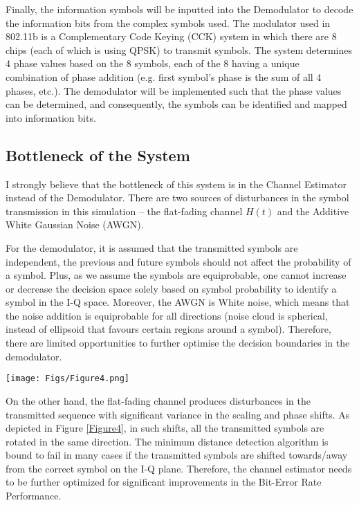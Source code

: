 \begin{flushleft}
Finally, the information symbols will be inputted into the Demodulator to decode the information bits
from the complex symbols used. The modulator used in 802.11b is a Complementary Code
Keying (CCK) system in which there are 8 chips (each of which is using QPSK) to transmit
symbols. The system determines 4 phase values based on the 8 symbols, each of the 8 having
a unique combination of phase addition (e.g. first symbol’s phase is the sum of all 4 phases,
etc.). The demodulator will be implemented such that the phase values can be determined,
and consequently, the symbols can be identified and mapped into information bits. \break

\subsection*{Bottleneck of the System}

I strongly believe that the bottleneck of this system is in the Channel Estimator instead of the
Demodulator. There are two sources of disturbances in the symbol transmission in this
simulation – the flat-fading channel $H(t)$ and the Additive White Gaussian Noise (AWGN).\break

For the demodulator, it is assumed that the transmitted symbols are independent, the previous
and future symbols should not affect the probability of a symbol. Plus, as we assume the
symbols are equiprobable, one cannot increase or decrease the decision space solely based on
symbol probability to identify a symbol in the I-Q space. Moreover, the AWGN is White noise, which means that the noise addition is equiprobable for all directions (noise cloud is spherical, instead of ellipsoid that favours certain regions around a symbol). Therefore, there are limited opportunities to further optimise the decision boundaries in the demodulator.\break

\begin{center}
    \begin{minipage}{0.4\linewidth}
    \centering
    \texttt{[image: Figs/Figure4.png]}
    \label{Figure4}
    \end{minipage} \break
\end{center}

On the other hand, the flat-fading channel produces disturbances in the transmitted sequence
with significant variance in the scaling and phase shifts. As depicted in Figure \ref{Figure4}, in such shifts, all the transmitted symbols are rotated in the same direction. The minimum distance detection algorithm is bound to fail in many cases if the transmitted symbols are shifted towards/away from the
correct symbol on the I-Q plane. Therefore, the channel estimator needs to be further
optimized for significant improvements in the Bit-Error Rate Performance. 

\end{flushleft}
